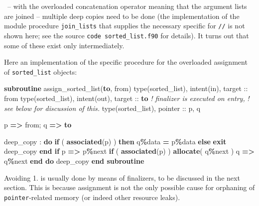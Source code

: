 \documentclass[
  paper=a4,
  ,captions=tableheading
]{scrartcl}
\newenvironment{Shaded}{\begin{snugshade}}{\end{snugshade}}
\newcommand{\CommentTok}[1]{\textcolor[rgb]{0.56,0.35,0.01}{\textit{#1}}}
\newcommand{\DataTypeTok}[1]{\textcolor[rgb]{0.13,0.29,0.53}{#1}}
\newcommand{\FunctionTok}[1]{\textcolor[rgb]{0.13,0.29,0.53}{\textbf{#1}}}
\newcommand{\KeywordTok}[1]{\textcolor[rgb]{0.13,0.29,0.53}{\textbf{#1}}}
\newcommand{\NormalTok}[1]{#1}
\newcommand{\OperatorTok}[1]{\textcolor[rgb]{0.81,0.36,0.00}{\textbf{#1}}}
\begin{document}
~-- with the overloaded concatenation operator meaning that the argument
lists are joined -- multiple deep copies need to be done (the
implementation of the module procedure \texttt{join\_lists} that
supplies the necessary specific for \texttt{//} is not shown here; see
the source \texttt{code\ sorted\_list.f90} for details). It turns out
that some of these exist only intermediately.

Here an implementation of the specific procedure for the overloaded
assignment of \texttt{sorted\_list} objects:

\begin{Shaded}
\begin{Highlighting}[]
\KeywordTok{subroutine}\NormalTok{ assign\_sorted\_list(}\KeywordTok{to}\NormalTok{, from)}
  \DataTypeTok{type(sorted\_list)}\NormalTok{, }\DataTypeTok{intent(in)}\NormalTok{, }\DataTypeTok{target} \DataTypeTok{::}\NormalTok{ from}
  \DataTypeTok{type(sorted\_list)}\NormalTok{, }\DataTypeTok{intent(out)}\NormalTok{, }\DataTypeTok{target} \DataTypeTok{::} \KeywordTok{to}  \CommentTok{! finalizer is executed on entry,}
                                                \CommentTok{! see below for discussion of this.}
  \DataTypeTok{type(sorted\_list)}\NormalTok{, }\DataTypeTok{pointer} \DataTypeTok{::}\NormalTok{ p, q}

\NormalTok{  p }\KeywordTok{=}\OperatorTok{\textgreater{}}\NormalTok{ from; q }\KeywordTok{=}\OperatorTok{\textgreater{}} \KeywordTok{to}

\NormalTok{  deep\_copy : }\KeywordTok{do}
    \KeywordTok{if}\NormalTok{ ( }\FunctionTok{associated}\NormalTok{(p) ) }\KeywordTok{then}
\NormalTok{      q}\OperatorTok{\%}\NormalTok{data }\KeywordTok{=}\NormalTok{ p}\OperatorTok{\%}\NormalTok{data}
    \KeywordTok{else}
      \KeywordTok{exit}\NormalTok{ deep\_copy}
    \KeywordTok{end if}
\NormalTok{    p }\KeywordTok{=}\OperatorTok{\textgreater{}}\NormalTok{ p}\OperatorTok{\%}\NormalTok{next}
    \KeywordTok{if}\NormalTok{ ( }\FunctionTok{associated}\NormalTok{(p) ) }\KeywordTok{allocate}\NormalTok{( q}\OperatorTok{\%}\NormalTok{next )}
\NormalTok{    q }\KeywordTok{=}\OperatorTok{\textgreater{}}\NormalTok{ q}\OperatorTok{\%}\NormalTok{next}
  \KeywordTok{end do}\NormalTok{ deep\_copy}
\KeywordTok{end subroutine}
\end{Highlighting}
\end{Shaded}

Avoiding 1. is usually done by means of finalizers, to be discussed in
the next section. This is because assignment is not the only possible
cause for orphaning of \texttt{pointer}-related memory (or indeed other
resource leaks).
\end{document}
